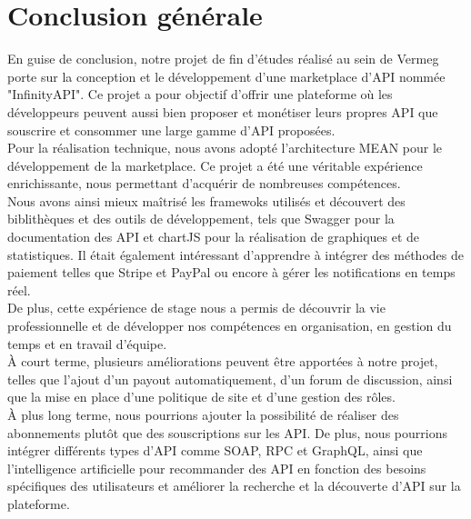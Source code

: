 \chapter*{Conclusion générale}


En guise de conclusion, notre projet de fin d’études réalisé au sein de Vermeg porte sur la conception et le développement d'une marketplace d’API nommée "InfinityAPI". Ce projet a pour objectif d'offrir une plateforme où les développeurs peuvent aussi bien proposer et monétiser leurs propres API que souscrire et consommer une large gamme d'API proposées.  \\
Pour la réalisation technique, nous avons adopté l’architecture MEAN pour le développement de la marketplace. Ce projet a été une véritable expérience enrichissante, nous permettant d’acquérir de nombreuses compétences.\\ Nous avons ainsi mieux maîtrisé les framewoks utilisés et découvert des biblithèques et des outils de développement, tels que Swagger pour la documentation des API et chartJS pour la réalisation de graphiques et de statistiques. Il était également intéressant d’apprendre à intégrer des méthodes de paiement telles que Stripe  et PayPal ou encore à gérer les notifications en temps réel.\\
De plus, cette expérience de stage nous a permis de découvrir la vie professionnelle et de développer nos compétences en organisation, en gestion du temps et en travail d'équipe.\\
À court terme, plusieurs améliorations peuvent être apportées à notre projet, telles que l'ajout d'un payout automatiquement, d'un forum de discussion, ainsi que la mise en place d'une politique de site et d'une gestion des rôles. \\ 
À plus long terme, nous pourrions ajouter la possibilité de réaliser des abonnements plutôt que des souscriptions sur les API. De plus, nous pourrions intégrer différents types d’API comme SOAP, RPC et GraphQL, ainsi que l’intelligence artificielle pour recommander des API en fonction des besoins spécifiques des utilisateurs et améliorer la recherche et la découverte d’API sur la plateforme. 